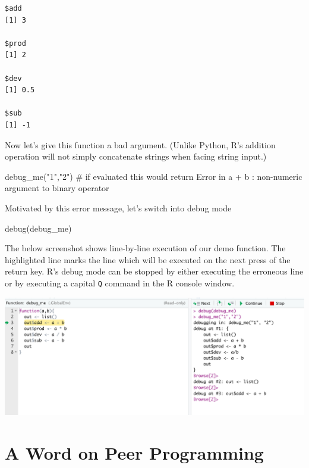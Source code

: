 \documentclass[
  12pt,
  letterpaper,
]{krantz}
\newenvironment{Shaded}{\begin{snugshade}}{\end{snugshade}}
\newcommand{\CommentTok}[1]{\textcolor[rgb]{0.37,0.37,0.37}{#1}}
\newcommand{\ControlFlowTok}[1]{\textcolor[rgb]{0.00,0.23,0.31}{#1}}
\newcommand{\FunctionTok}[1]{\textcolor[rgb]{0.28,0.35,0.67}{#1}}
\newcommand{\NormalTok}[1]{\textcolor[rgb]{0.00,0.23,0.31}{#1}}
\newcommand{\SpecialCharTok}[1]{\textcolor[rgb]{0.37,0.37,0.37}{#1}}
\newcommand{\StringTok}[1]{\textcolor[rgb]{0.13,0.47,0.30}{#1}}
\begin{document}
\begin{verbatim}
$add
[1] 3

$prod
[1] 2

$dev
[1] 0.5

$sub
[1] -1
\end{verbatim}

Now let's give this function a bad argument. (Unlike Python, R's
addition operation will not simply concatenate strings when facing
string input.)

\begin{Shaded}
\begin{Highlighting}[]
\FunctionTok{debug\_me}\NormalTok{(}\StringTok{"1"}\NormalTok{,}\StringTok{"2"}\NormalTok{)}
\CommentTok{\# if evaluated this would return}
\NormalTok{Error }\ControlFlowTok{in}\NormalTok{ a }\SpecialCharTok{+}\NormalTok{ b }\SpecialCharTok{:}\NormalTok{ non}\SpecialCharTok{{-}}\NormalTok{numeric argument}
\NormalTok{to binary operator}
\end{Highlighting}
\end{Shaded}

Motivated by this error message, let's switch into debug mode

\begin{Shaded}
\begin{Highlighting}[]
\FunctionTok{debug}\NormalTok{(debug\_me)}
\end{Highlighting}
\end{Shaded}

The below screenshot shows line-by-line execution of our demo function.
The highlighted line marks the line which will be executed on the next
press of the return key. R's debug mode can be stopped by either
executing the erroneous line or by executing a capital \texttt{Q}
command in the R console window.

\includegraphics{./images/debug.png}

\hypertarget{a-word-on-peer-programming}{%
\section{A Word on Peer Programming}\label{a-word-on-peer-programming}}
\end{document}
